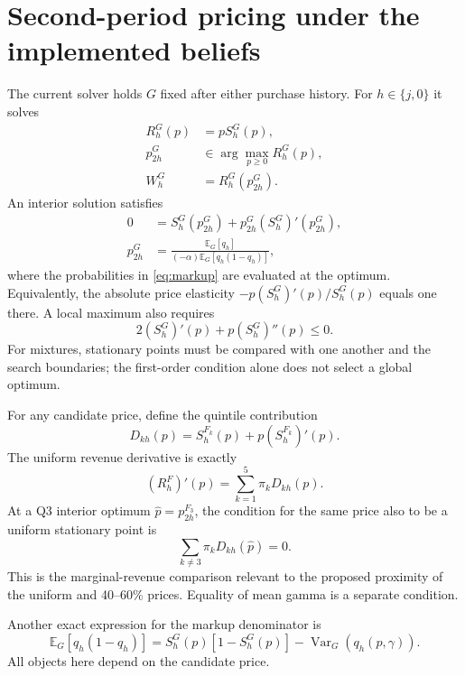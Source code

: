 \documentclass[11pt]{article}
\newcommand{\E}{\mathbb{E}}
\begin{document}
\section{Second-period pricing under the implemented beliefs}
The current solver holds $G$ fixed after either purchase history. For
$h\in\{j,0\}$ it solves
\begin{align}
 R_h^G(p)&=pS_h^G(p),\\
 p_{2h}^G&\in\arg\max_{p\geq0}R_h^G(p),\\
 W_h^G&=R_h^G(p_{2h}^G).
\end{align}
An interior solution satisfies
\begin{align}
 0&=S_h^G(p_{2h}^G)+p_{2h}^G(S_h^G)'(p_{2h}^G),\label{eq:terminalfoc}\\
 p_{2h}^G
 &=\frac{\E_G[q_h]}{(-\alpha)\E_G[q_h(1-q_h)]},\label{eq:markup}
\end{align}
where the probabilities in \eqref{eq:markup} are evaluated at the optimum.
Equivalently, the absolute price elasticity
$-p(S_h^G)'(p)/S_h^G(p)$ equals one there. A local maximum also requires
\begin{equation}
 2(S_h^G)'(p)+p(S_h^G)''(p)\leq0.
\end{equation}
For mixtures, stationary points must be compared with one another and the
search boundaries; the first-order condition alone does not select a global optimum.

For any candidate price, define the quintile contribution
\begin{equation}
 D_{kh}(p)=S_h^{F_k}(p)+p(S_h^{F_k})'(p).
\end{equation}
The uniform revenue derivative is exactly
\begin{equation}
 (R_h^F)'(p)=\sum_{k=1}^5\pi_k D_{kh}(p).\label{eq:contrib}
\end{equation}
At a Q3 interior optimum $\widehat p=p_{2h}^{F_3}$, the condition for the
same price also to be a uniform stationary point is
\begin{equation}
 \sum_{k\ne3}\pi_k D_{kh}(\widehat p)=0.
\end{equation}
This is the marginal-revenue comparison relevant to the proposed proximity
of the uniform and 40--60\% prices. Equality of mean gamma is a separate condition.

Another exact expression for the markup denominator is
\begin{equation}
 \E_G[q_h(1-q_h)]
 =S_h^G(p)[1-S_h^G(p)]-\operatorname{Var}_G(q_h(p,\gamma)).
\end{equation}
All objects here depend on the candidate price.
\end{document}
